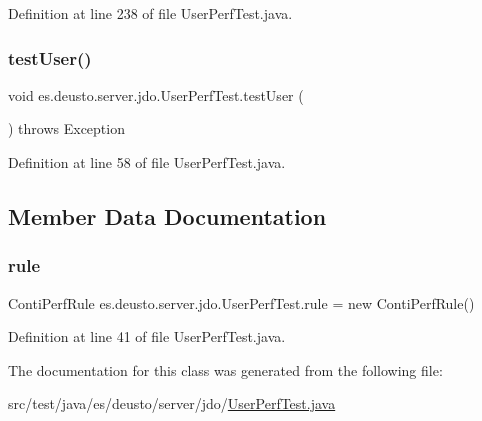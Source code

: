 Definition at line 238 of file User\+Perf\+Test.\+java.

\mbox{\label{classes_1_1deusto_1_1server_1_1jdo_1_1_user_perf_test_a556ef1732826be65497e0979bb7d063a}} 
\subsubsection{\texorpdfstring{test\+User()}{testUser()}}
{\footnotesize\ttfamily void es.\+deusto.\+server.\+jdo.\+User\+Perf\+Test.\+test\+User (\begin{DoxyParamCaption}{ }\end{DoxyParamCaption}) throws Exception}



Definition at line 58 of file User\+Perf\+Test.\+java.



\subsection{Member Data Documentation}
\mbox{\label{classes_1_1deusto_1_1server_1_1jdo_1_1_user_perf_test_af2b161e23a713f11bdff3f0c2a2b7801}} 
\subsubsection{\texorpdfstring{rule}{rule}}
{\footnotesize\ttfamily Conti\+Perf\+Rule es.\+deusto.\+server.\+jdo.\+User\+Perf\+Test.\+rule = new Conti\+Perf\+Rule()}



Definition at line 41 of file User\+Perf\+Test.\+java.



The documentation for this class was generated from the following file\+:\begin{DoxyCompactItemize}
\item 
src/test/java/es/deusto/server/jdo/\hyperlink{_user_perf_test_8java}{User\+Perf\+Test.\+java}\end{DoxyCompactItemize}
